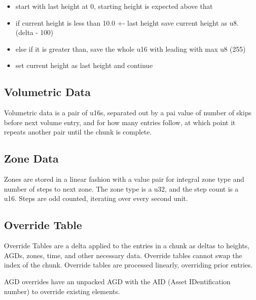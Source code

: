 \begin{itemize}
    \item start with last height at 0, starting height is expected above that
    \item if current height is less than 10.0 +- last height save current height as u8. (delta - 100)
    \item else if it is greater than, save the whole u16 with leading with max u8 (255)
    \item set current height as last height and continue
\end{itemize}

\subsection{Volumetric Data}

Volumetric data is a pair of u16s, separated out by a pai value of number of skips before next volume entry, and for how many entries follow, at which point it repeats another pair until the chunk is complete. 

\subsection{Zone Data}
    Zones are stored in a linear fashion with a value pair for integral zone type and number of steps to next zone. The zone type is a u32, and the step count is a u16. Steps are odd counted, iterating over every second unit.

\subsection{Override Table}
    Override Tables are a delta applied to the entries in a chunk as deltas to heights, AGDs, zones, time, and other necessary data. Override tables cannot swap the index of the chunk. Override tables are processed linearly, overriding prior entries.
    
    AGD overrides have an unpacked AGD with the AID (Asset IDentification number) to override existing elements.


